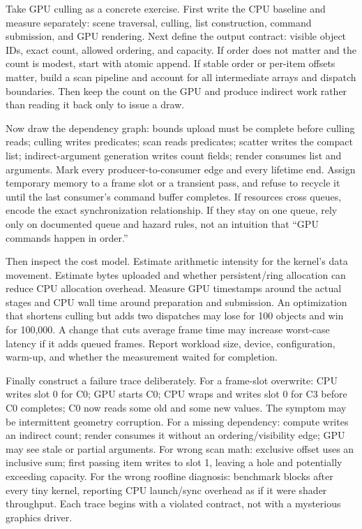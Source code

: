 Take GPU culling as a concrete exercise. First write the CPU baseline and measure separately: scene traversal, culling, list construction, command submission, and GPU rendering. Next define the output contract: visible object IDs, exact count, allowed ordering, and capacity. If order does not matter and the count is modest, start with atomic append. If stable order or per-item offsets matter, build a scan pipeline and account for all intermediate arrays and dispatch boundaries. Then keep the count on the GPU and produce indirect work rather than reading it back only to issue a draw.

Now draw the dependency graph: bounds upload must be complete before culling reads; culling writes predicates; scan reads predicates; scatter writes the compact list; indirect-argument generation writes count fields; render consumes list and arguments. Mark every producer-to-consumer edge and every lifetime end. Assign temporary memory to a frame slot or a transient pass, and refuse to recycle it until the last consumer's command buffer completes. If resources cross queues, encode the exact synchronization relationship. If they stay on one queue, rely only on documented queue and hazard rules, not an intuition that ``GPU commands happen in order.''

Then inspect the cost model. Estimate arithmetic intensity for the kernel's data movement. Estimate bytes uploaded and whether persistent/ring allocation can reduce CPU allocation overhead. Measure GPU timestamps around the actual stages and CPU wall time around preparation and submission. An optimization that shortens culling but adds two dispatches may lose for 100 objects and win for 100,000. A change that cuts average frame time may increase worst-case latency if it adds queued frames. Report workload size, device, configuration, warm-up, and whether the measurement waited for completion.

Finally construct a failure trace deliberately. For a frame-slot overwrite: CPU writes slot 0 for C0; GPU starts C0; CPU wraps and writes slot 0 for C3 before C0 completes; C0 now reads some old and some new values. The symptom may be intermittent geometry corruption. For a missing dependency: compute writes an indirect count; render consumes it without an ordering/visibility edge; GPU may see stale or partial arguments. For wrong scan math: exclusive offset uses an inclusive sum; first passing item writes to slot 1, leaving a hole and potentially exceeding capacity. For the wrong roofline diagnosis: benchmark blocks after every tiny kernel, reporting CPU launch/sync overhead as if it were shader throughput. Each trace begins with a violated contract, not with a mysterious graphics driver.

